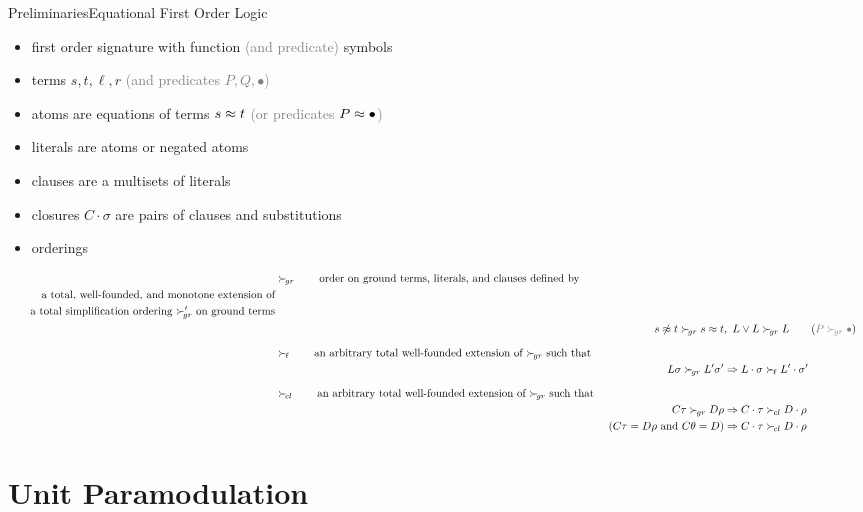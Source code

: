 \documentclass[%
handout,
]{beamer}
\begin{document}
\begin{frame}[allowframebreaks]{Preliminaries}{Equational First Order Logic}

    \begin{itemize}
        \item first order signature with function \textcolor{gray}{(and predicate)} symbols
        \item terms $s,t,\ell,r$ \textcolor{gray}{(and predicates $P, Q, \bullet$)}
        \item atoms are equations of terms $s\approx t$ \textcolor{gray}{(or predicates $P\approx\bullet$)}
        \item literals are atoms or negated atoms
        \item clauses are a multisets of literals
        \item closures $C\cdot\sigma$ are pairs of clauses and substitutions
        \framebreak
        \item orderings
    \end{itemize}
    \vspace{-1.4em}
    \begin{align*}
        &\succG
        \tag*{order on ground terms, literals, and clauses defined by}
        \\
        \tag*{a total, well-founded, and monotone extension of}
        \\
        \tag*{a total simplification ordering $\succG'$ on ground terms}
        \\
        &&s\mNE t \succG s\mEQ t &,\ L\lor L \succG L
        \tag{\textcolor{gray}{$P\succG\bullet$}}
        \\[0.7em]
        &\succL
        \tag*{an arbitrary total well-founded extension of $\succG$ such that}
        \\
        && L\sigma\succG L'\sigma' &\Rightarrow L\cdot\sigma\succL L'\cdot\sigma'\tag*{}
        \\[0.7em]
        &\succC \tag*{an arbitrary total well-founded extension of $\succG$ such that }
        \\
        && C\tau\succG D\rho
        &\Rightarrow C\cdot\tau\succC D\cdot\rho
        \\
        && (C\tau=D\rho\text{ and }C\theta = D)
        &\Rightarrow C\cdot\tau\succC D\cdot\rho   \tag*{}
    \end{align*}
\end{frame}


\section{Unit Paramodulation}
\end{document}
